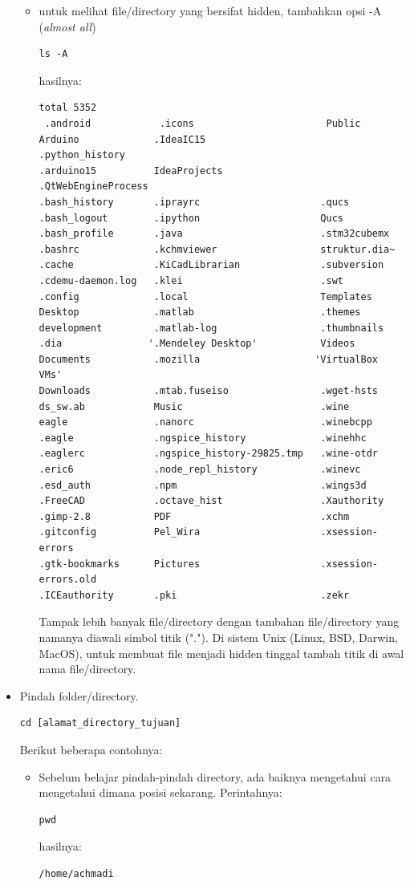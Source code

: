 \documentclass[12pt,]{article}
\begin{document}
\begin{itemize}
\begin{itemize}
			\item untuk melihat file/directory yang bersifat hidden, tambahkan opsi -A (\textit{almost all})
			\begin{verbatim}
ls -A
			\end{verbatim}
			hasilnya:
			\begin{verbatim}
total 5352
 .android            .icons                       Public
Arduino             .IdeaIC15                    .python_history
.arduino15          IdeaProjects                 .QtWebEngineProcess
.bash_history       .iprayrc                     .qucs
.bash_logout        .ipython                     Qucs
.bash_profile       .java                        .stm32cubemx
.bashrc             .kchmviewer                  struktur.dia~
.cache              .KiCadLibrarian              .subversion
.cdemu-daemon.log   .klei                        .swt
.config             .local                       Templates
Desktop             .matlab                      .themes
development         .matlab-log                  .thumbnails
.dia               '.Mendeley Desktop'           Videos
Documents           .mozilla                    'VirtualBox VMs'
Downloads           .mtab.fuseiso                .wget-hsts
ds_sw.ab            Music                        .wine
eagle               .nanorc                      .winebcpp
.eagle              .ngspice_history             .winehhc
.eaglerc            .ngspice_history-29825.tmp   .wine-otdr
.eric6              .node_repl_history           .winevc
.esd_auth           .npm                         .wings3d
.FreeCAD            .octave_hist                 .Xauthority
.gimp-2.8           PDF                          .xchm
.gitconfig          Pel_Wira                     .xsession-errors
.gtk-bookmarks      Pictures                     .xsession-errors.old
.ICEauthority       .pki                         .zekr
			\end{verbatim}
			Tampak lebih banyak file/directory dengan tambahan file/directory yang namanya diawali simbol titik (".").
			Di sistem Unix (Linux, BSD, Darwin, MacOS), untuk membuat file menjadi hidden tinggal tambah titik di awal nama file/directory.
		\end{itemize}
	
		\item Pindah folder/directory.
		\begin{verbatim}
cd [alamat_directory_tujuan]
		\end{verbatim}
		Berikut beberapa contohnya:
		\begin{itemize}
			\item Sebelum belajar pindah-pindah directory, ada baiknya mengetahui cara mengetahui dimana posisi sekarang.
			Perintahnya:
			\begin{verbatim}
pwd
			\end{verbatim}
			hasilnya:
			\begin{verbatim}
/home/achmadi
			\end{verbatim}
			

\end{itemize}
\end{itemize}
\end{document}
